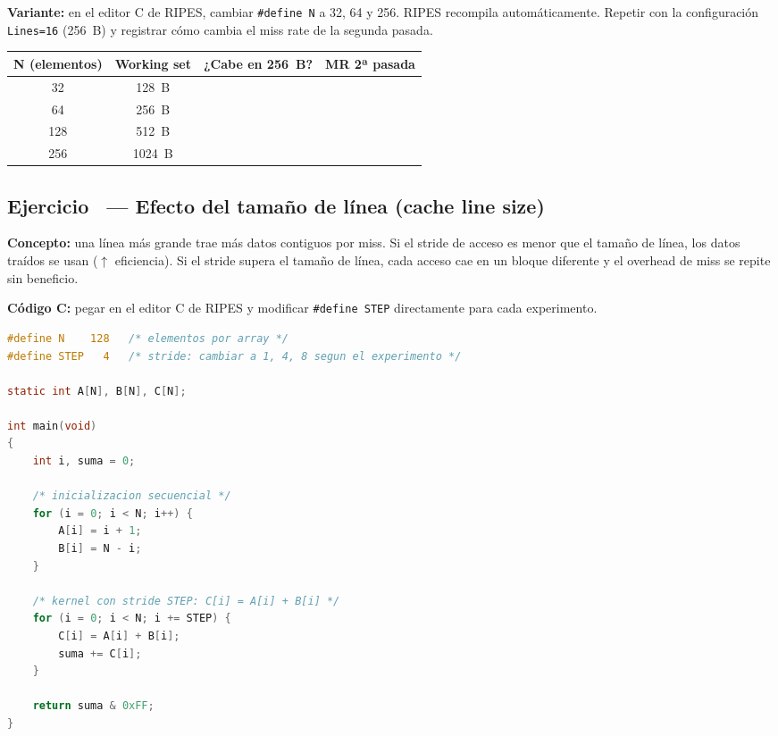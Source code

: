 \documentclass[12pt, a4paper]{article}
\newcounter{ejnum}
\newcommand{\ejerciciosec}[1]{%
  \stepcounter{ejnum}%
  \subsection{Ejercicio \theejnum\ — #1}%
}
\begin{document}
\vspace{0.5cm}
\textbf{Variante:} en el editor C de RIPES, cambiar \texttt{\#define N} a
32, 64 y 256. RIPES recompila automáticamente. Repetir con la configuración
\texttt{Lines=16} (256~B) y registrar cómo cambia el miss rate de la segunda pasada.

\begin{center}
\renewcommand{\arraystretch}{1.8}
\begin{tabular}{|c|c|c|c|}
    \hline
    \textbf{N (elementos)} & \textbf{Working set} & \textbf{¿Cabe en 256~B?} & \textbf{MR 2ª pasada} \\
    \hline
    32  & 128~B & & \\
    \hline
    64  & 256~B & & \\
    \hline
    128 & 512~B & & \\
    \hline
    256 & 1024~B & & \\
    \hline
\end{tabular}
\end{center}

\newpage

\ejerciciosec{Efecto del tamaño de línea (cache line size)}

\textbf{Concepto:} una línea más grande trae más datos contiguos por miss.
Si el stride de acceso es menor que el tamaño de línea, los datos traídos
se usan ($\uparrow$ eficiencia). Si el stride supera el tamaño de línea,
cada acceso cae en un bloque diferente y el overhead de miss se repite
sin beneficio.

\textbf{Código C:} pegar en el editor C de RIPES y modificar \texttt{\#define STEP}
directamente para cada experimento.

\begin{lstlisting}[language=C, caption={stride\_test.c — pegar en el editor C de RIPES}]
#define N    128   /* elementos por array */
#define STEP   4   /* stride: cambiar a 1, 4, 8 segun el experimento */

static int A[N], B[N], C[N];

int main(void)
{
    int i, suma = 0;

    /* inicializacion secuencial */
    for (i = 0; i < N; i++) {
        A[i] = i + 1;
        B[i] = N - i;
    }

    /* kernel con stride STEP: C[i] = A[i] + B[i] */
    for (i = 0; i < N; i += STEP) {
        C[i] = A[i] + B[i];
        suma += C[i];
    }

    return suma & 0xFF;
}
\end{lstlisting}
\end{document}
